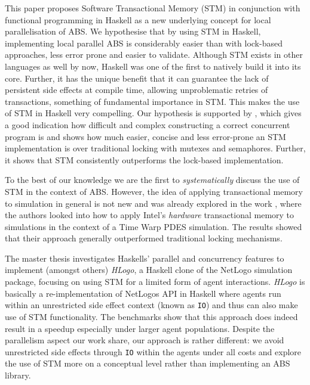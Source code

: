 This paper proposes Software Transactional Memory (STM) in conjunction with functional programming in Haskell \cite{hudak_history_2007} as a new underlying concept for local parallelisation of ABS. We hypothesise that by using STM in Haskell, implementing local parallel ABS is considerably easier than with lock-based approaches, less error prone and easier to validate. Although STM exists in other languages as well by now, Haskell was one of the first to natively build it into its core. Further, it has the unique benefit that it can guarantee the lack of persistent side effects at compile time, allowing unproblematic retries of transactions, something of fundamental importance in STM. This makes the use of STM in Haskell very compelling. 
Our hypothesis is supported by \cite{discolo_lock_2006}, which gives a good indication how difficult and complex constructing a correct concurrent program is and shows how much easier, concise and less error-prone an STM implementation is over traditional locking with mutexes and semaphores. Further, it shows that STM consistently outperforms the lock-based implementation.


\medskip

To the best of our knowledge we are the first to \textit{systematically} discuss the use of STM in the context of ABS. However, the idea of applying transactional memory to simulation in general is not new and was already explored in the work \cite{hay_experiments_2015}, where the authors looked into how to apply Intel’s \textit{hardware} transactional memory to simulations in the context of a Time Warp PDES simulation. The results showed that their approach generally outperformed traditional locking mechanisms.

The master thesis \cite{bezirgiannis_improving_2013} investigates Haskells' parallel and concurrency features to implement (amongst others) \textit{HLogo}, a Haskell clone of the NetLogo \cite{wilensky_introduction_2015} simulation package, focusing on using STM for a limited form of agent interactions. \textit{HLogo} is basically a re-implementation of NetLogos API in Haskell where agents run within an unrestricted side effect context (known as \texttt{IO}) and thus can also make use of STM functionality. The benchmarks show that this approach does indeed result in a speedup especially under larger agent populations. Despite the parallelism aspect our work share, our approach is rather different: we avoid unrestricted side effects through \texttt{IO} within the agents under all costs and explore the use of STM more on a conceptual level rather than implementing an ABS library.

